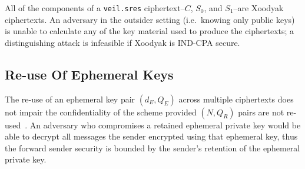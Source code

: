All of the components of a \texttt{veil.sres} ciphertext--$C$, $S_0$, and $S_1$--are Xoodyak ciphertexts.
An adversary in the outsider setting (i.e.\ knowing only public keys) is unable to calculate any of the key material
used to produce the ciphertexts;
a distinguishing attack is infeasible if Xoodyak is IND-CPA secure.

\subsection{Re-use Of Ephemeral Keys}\label{subsec:veil.sres-re-using-ephemeral-keys}

The re-use of an ephemeral key pair $(d_E, Q_E)$ across multiple ciphertexts does not impair the confidentiality of the
scheme provided $(N, Q_R)$ pairs are not re-used~\cite{bellare2003}.
An adversary who compromises a retained ephemeral private key would be able to decrypt all messages the sender encrypted
using that ephemeral key, thus the forward sender security is bounded by the sender's retention of the ephemeral private
key.

